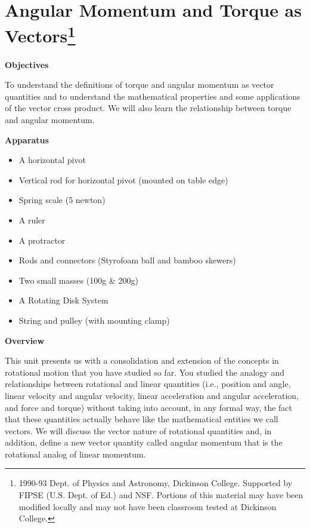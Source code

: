 \def\bmath#1{\mbox{\boldmath$#1$}} 


\section{Angular Momentum and Torque as Vectors\footnote{
1990-93 Dept. of Physics and Astronomy, Dickinson College. Supported by FIPSE
(U.S. Dept. of Ed.) and NSF. Portions of this material may have been modified
locally and may not have been classroom tested at Dickinson College.
}}

\makelabheader %

\bigskip
\textbf{Objectives }

To understand the definitions of torque and angular momentum as vector quantities
and to understand the mathematical properties and some applications of the vector
cross product. We will also learn the relationship between torque and angular
momentum.

\textbf{Apparatus}

\begin{itemize}
\item A horizontal pivot
\item Vertical rod for horizontal pivot (mounted on table edge)
\item Spring scale (5 newton)
\item A ruler 
\item A protractor 
\item Rods and connectors (Styrofoam ball and bamboo skewers)
\item Two small masses (100g \& 200g) 
\item A Rotating Disk System 
\item String and pulley (with mounting clamp)
\end{itemize}
\textbf{Overview} 

This unit presents us with a consolidation and extension of the concepts in
rotational motion that you have studied so far. You studied the analogy and
relationships between rotational and linear quantities (i.e., position and angle,
linear velocity and angular velocity, linear acceleration and angular acceleration,
and force and torque) without taking into account, in any formal way, the fact
that these quantities actually behave like the mathematical entities we call
vectors. We will discuss the vector nature of rotational quantities and, in
addition, define a new vector quantity called angular momentum that is the rotational
analog of linear momentum. 

